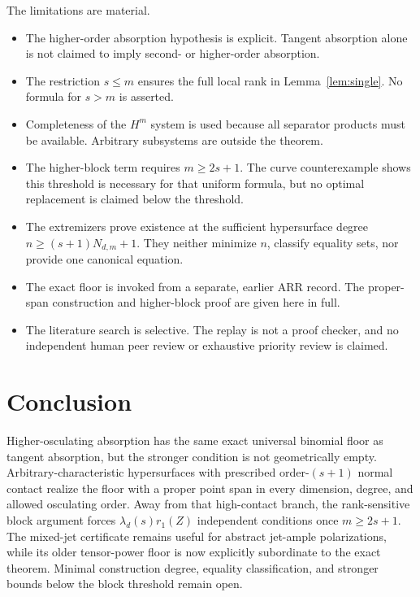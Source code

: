 \documentclass[11pt]{article}
\theoremstyle{definition}
\theoremstyle{remark}
\theoremstyle{plain}
\begin{document}
The limitations are material.
\begin{itemize}
\item The higher-order absorption hypothesis is explicit.  Tangent absorption
alone is not claimed to imply second- or higher-order absorption.
\item The restriction $s\leq m$ ensures the full local rank in
Lemma~\ref{lem:single}.  No formula for $s>m$ is asserted.
\item Completeness of the $H^m$ system is used because all separator products
must be available.  Arbitrary subsystems are outside the theorem.
\item The higher-block term requires $m\geq2s+1$.  The curve counterexample
shows this threshold is necessary for that uniform formula, but no optimal
replacement is claimed below the threshold.
\item The extremizers prove existence at the sufficient hypersurface degree
$n\geq(s+1)N_{d,m}+1$.  They neither minimize $n$, classify equality sets,
nor provide one canonical equation.
\item The exact floor is invoked from a separate, earlier ARR record.  The
proper-span construction and higher-block proof are given here in full.
\item The literature search is selective.  The replay is not a proof checker,
and no independent human peer review or exhaustive priority review is
claimed.
\end{itemize}

\section{Conclusion}

Higher-osculating absorption has the same exact universal binomial floor as
tangent absorption, but the stronger condition is not geometrically empty.
Arbitrary-characteristic hypersurfaces with prescribed order-$(s+1)$ normal
contact realize the floor with a proper point span in every dimension,
degree, and allowed osculating order.  Away from that high-contact branch,
the rank-sensitive block argument forces
$\lambda_d(s)r_1(Z)$ independent conditions once $m\geq2s+1$.  The mixed-jet
certificate remains useful for abstract jet-ample polarizations, while its
older tensor-power floor is now explicitly subordinate to the exact theorem.
Minimal construction degree, equality classification, and stronger bounds
below the block threshold remain open.
\end{document}
